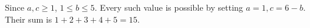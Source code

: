 Since $a,c\ge1$, $1\le b\le5$. Every such value is possible by setting $a=1,c=6-b$. Their sum is $1+2+3+4+5=\boxed{15}$.
